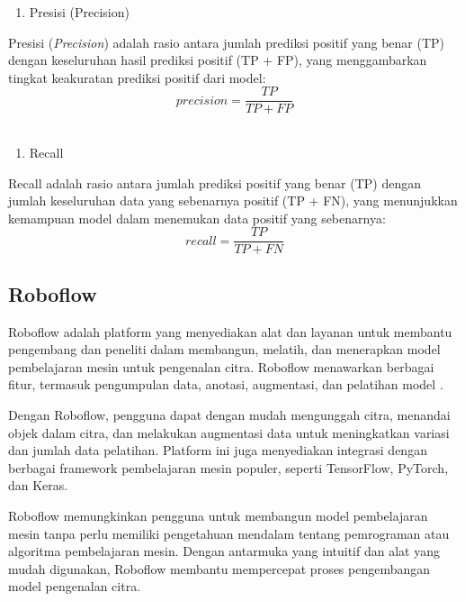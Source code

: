 \begin{enumerate} [resume]
	\item {Presisi (Precision)}\label{II.Ekstraksi Fitur Tekstur.Kontras}
\end{enumerate}
Presisi (\textit{Precision}) adalah rasio antara jumlah prediksi positif yang benar (TP) dengan keseluruhan hasil prediksi positif (TP + FP), yang menggambarkan tingkat keakuratan prediksi positif dari model:
\begin{equation}
    precision = \frac{TP}{TP + FP}
    \label{eq:precision}
\end{equation}
\\
\begin{enumerate}  [resume]
	\item {Recall}\label{II.Ekstraksi Fitur Tekstur.Kontras}
\end{enumerate}
Recall adalah rasio antara jumlah prediksi positif yang benar (TP) dengan jumlah keseluruhan data yang sebenarnya positif (TP + FN), yang menunjukkan kemampuan model dalam menemukan data positif yang sebenarnya:
\begin{equation}
    recall = \frac{TP}{TP + FN}
    \label{eq:recall}
\end{equation}

\subsection{Roboflow} \label{II.Roboflow}
Roboflow adalah platform yang menyediakan alat dan layanan untuk membantu pengembang dan peneliti dalam membangun, melatih, dan menerapkan model pembelajaran mesin untuk pengenalan citra. Roboflow menawarkan berbagai fitur, termasuk pengumpulan data, anotasi, augmentasi, dan pelatihan model \cite{saepudin2024analisis}.

Dengan Roboflow, pengguna dapat dengan mudah mengunggah citra, menandai objek dalam citra, dan melakukan augmentasi data untuk meningkatkan variasi dan jumlah data pelatihan. Platform ini juga menyediakan integrasi dengan berbagai framework pembelajaran mesin populer, seperti TensorFlow, PyTorch, dan Keras.

Roboflow memungkinkan pengguna untuk membangun model pembelajaran mesin tanpa perlu memiliki pengetahuan mendalam tentang pemrograman atau algoritma pembelajaran mesin. Dengan antarmuka yang intuitif dan alat yang mudah digunakan, Roboflow membantu mempercepat proses pengembangan model pengenalan citra.

